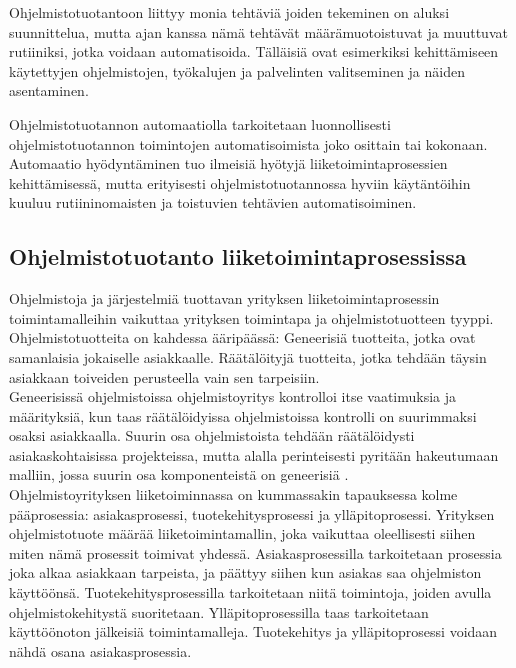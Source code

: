 \documentclass[finnish,12pt,a4paper,pdftex]{article}
\begin{document}
\noindent Ohjelmistotuotantoon liittyy monia tehtäviä joiden tekeminen on aluksi suunnittelua, mutta ajan kanssa nämä tehtävät määrämuotoistuvat ja muuttuvat rutiiniksi, jotka voidaan automatisoida. Tälläisiä ovat esimerkiksi kehittämiseen käytettyjen ohjelmistojen, työkalujen ja palvelinten valitseminen ja näiden asentaminen. \citep{kallio}

\noindent Ohjelmistotuotannon automaatiolla tarkoitetaan luonnollisesti ohjelmistotuotannon toimintojen automatisoimista joko osittain tai kokonaan. Automaatio hyödyntäminen tuo ilmeisiä hyötyjä liiketoimintaprosessien kehittämisessä, mutta erityisesti ohjelmistotuotannossa hyviin käytäntöihin kuuluu rutiininomaisten ja toistuvien tehtävien automatisoiminen. \citep{leanit}


\subsection{Ohjelmistotuotanto liiketoimintaprosessissa}

Ohjelmistoja ja järjestelmiä tuottavan yrityksen liiketoimintaprosessin toimintamalleihin vaikuttaa yrityksen toimintapa ja ohjelmistotuotteen tyyppi. Ohjelmistotuotteita on kahdessa ääripäässä: Geneerisiä tuotteita, jotka ovat samanlaisia jokaiselle asiakkaalle. Räätälöityjä tuotteita, jotka tehdään täysin asiakkaan toiveiden perusteella vain sen tarpeisiin. \citep{sommerville} \\

\noindent Geneerisissä ohjelmistoissa ohjelmistoyritys kontrolloi itse vaatimuksia ja määrityksiä, kun taas räätälöidyissa ohjelmistoissa kontrolli on suurimmaksi osaksi asiakkaalla. Suurin osa ohjelmistoista tehdään räätälöidysti asiakaskohtaisissa projekteissa, mutta alalla perinteisesti pyritään hakeutumaan malliin, jossa suurin osa komponenteistä on geneerisiä \citep{sommerville}.\\

\noindent Ohjelmistoyrityksen liiketoiminnassa on kummassakin tapauksessa kolme pääprosessia: asiakasprosessi, tuotekehitysprosessi ja ylläpitoprosessi. Yrityksen ohjelmistotuote määrää liiketoimintamallin, joka vaikuttaa oleellisesti siihen miten nämä prosessit toimivat yhdessä. Asiakasprosessilla tarkoitetaan prosessia joka alkaa asiakkaan tarpeista, ja päättyy siihen kun asiakas saa ohjelmiston käyttöönsä. Tuotekehitysprosessilla tarkoitetaan niitä toimintoja, joiden avulla ohjelmistokehitystä suoritetaan. Ylläpitoprosessilla taas tarkoitetaan käyttöönoton jälkeisiä toimintamalleja. Tuotekehitys ja ylläpitoprosessi voidaan nähdä osana asiakasprosessia. \citep{okaytannot}\\
\end{document}
